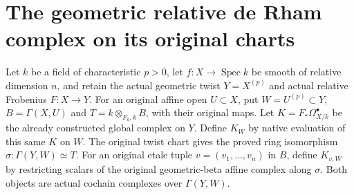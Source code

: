 \section{The geometric relative de Rham complex on its original charts}

\begin{definition}
\label{def:cartier-geometric-chart-section-complex}
\leanok
{}
Let $k$ be a field of characteristic $p>0$, let $f:X\to\operatorname{Spec}k$
be smooth of relative dimension $n$, and retain the actual geometric
twist $Y=X^{(p)}$ and actual relative Frobenius $F:X\to Y$.
For an original affine open $U\subset X$, put $W=U^{(p)}\subset Y$,
$B=\Gamma(X,U)$ and $T=k\otimes_{F_k,k}B$, with their original maps.
Let $K=F_*\Omega^\bullet_{X/k}$ be the already constructed global
complex on $Y$. Define $K_W$ by native evaluation of this same $K$ on
$W$. The original twist chart gives the proved ring isomorphism
$\sigma:\Gamma(Y,W)\simeq T$. For an original etale tuple
$v=(v_1,\ldots,v_n)$ in $B$, define $K_{v,W}$ by restricting scalars
of the original geometric-beta affine complex along $\sigma$.
Both objects are actual cochain complexes over $\Gamma(Y,W)$.
\end{definition}

